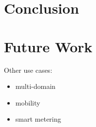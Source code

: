 \section{Conclusion} %
\label{sec:conclusion}


\section{Future Work} %
\label{sec:future_work}

Other use cases:
\begin{itemize}
	\item multi-domain
	\item mobility
	\item smart metering
\end{itemize}



